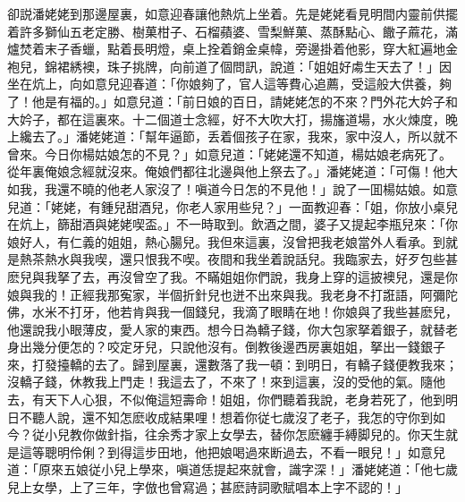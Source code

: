 卻説潘姥姥到那邊屋裏，如意迎春讓他熱炕上坐着。先是姥姥看見明間内靈前供擺着許多獅仙五老定勝、樹菓柑子、石榴蘋婆、雪梨鮮菓、蒸酥點心、饊子蔴花，滿爐焚着末子香蠟，點着長明燈，桌上拴着銷金桌幃，旁邊掛着他影，穿大紅遍地金袍兒，錦裙綉襖，珠子挑牌，向前道了個問訊，說道：「姐姐好䖏生天去了！」因坐在炕上，向如意兒迎春道：「你娘夠了，官人這等費心追薦，受這般大供養，夠了！他是有福的。」如意兒道：「前日娘的百日，請姥姥怎的不來？門外花大妗子和大妗子，都在這裏來。十二個道士念經，好不大吹大打，揚旛道場，水火煉度，晚上纔去了。」潘姥姥道：「幫年逼節，丢着個孩子在家，我來，家中沒人，所以就不曾來。今日你楊姑娘怎的不見？」如意兒道：「姥姥還不知道，楊姑娘老病死了。從年裏俺娘念經就沒來。俺娘們都往北邊與他上祭去了。」潘姥姥道：「可傷！他大如我，我還不曉的他老人家沒了！嗔道今日怎的不見他！」說了一囬楊姑娘。如意兒道：「姥姥，有鍾兒甜酒兒，你老人家用些兒？」一面教迎春：「姐，你放小桌兒在炕上，篩甜酒與姥姥喫盃。」不一時取到。飲酒之間，婆子又提起李瓶兒來：「你娘好人，有仁義的姐姐，熱心腸兒。我但來這裏，沒曾把我老娘當外人看承。到就是熱茶熱水與我喫，還只恨我不喫。夜間和我坐着說話兒。我臨家去，好歹包些甚麽兒與我拏了去，再沒曾空了我。不瞞姐姐你們說，我身上穿的這披襖兒，還是你娘與我的！正經我那寃家，半個折針兒也迸不出來與我。我老身不打誑語，阿彌陀佛，水米不打牙，他若肯與我一個錢兒，我滴了眼睛在地！你娘與了我些甚麽兒，他還說我小眼薄皮，愛人家的東西。想今日為轎子錢，你大包家拏着銀子，就替老身出幾分便怎的？咬定牙兒，只說他沒有。倒教後邊西房裏姐姐，拏出一錢銀子來，打發擡轎的去了。歸到屋裏，還數落了我一頓：到明日，有轎子錢便教我來；沒轎子錢，休教我上門走！我這去了，不來了！來到這裏，沒的受他的氣。隨他去，有天下人心狠，不似俺這短壽命！姐姐，你們聽着我說，老身若死了，他到明日不聽人說，還不知怎麽收成結果哩！想着你従七歲沒了老子，我怎的守你到如今？従小兒教你做針指，往余秀才家上女學去，替你怎麽纏手縛脚兒的。你天生就是這等聰明伶俐？到得這步田地，他把娘喝過來断過去，不看一眼兒！」如意兒道：「原來五娘従小兒上學來，嗔道恁提起來就會，識字深！」潘姥姥道：「他七歲兒上女學，上了三年，字倣也曾寫過；甚麽詩詞歌賦唱本上字不認的！」

